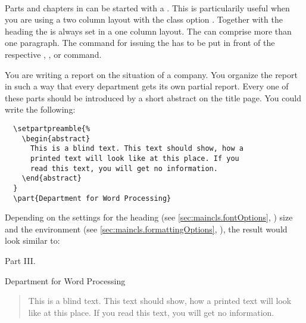 \begin{Declaration}
  \\
\end{Declaration}%
%
%
Parts and chapters in
{\KOMAScript} can be started with a . This is
particularily useful when you are using a two column layout with the
class option . Together with
the heading the  is always set in a one column layout.
The  can comprise more than one paragraph. The command
for issuing the  has to be put in front of the
respective , ,  or
 command.
\begin{Example}
  You are writing a report on the situation of a company. You organize
  the report in such a way that every department gets its own partial report.
  Every one of these parts should be introduced by a short abstract on the
  title page. You could write the following:
\begin{lstlisting}
  \setpartpreamble{%
    \begin{abstract}
      This is a blind text. This text should show, how a
      printed text will look like at this place. If you
      read this text, you will get no information.
    \end{abstract}
  }
  \part{Department for Word Processing}
\end{lstlisting}
  Depending on the settings for the heading (see
  \autoref{sec:maincls.fontOptions},
  ) size and the
   environment (see
  \autoref{sec:maincls.formattingOptions},
  ), the result would look similar
  to:
  \begin{ShowOutput}\centering
    {\LARGE{} Part III.\par\vspace{20pt}}
    {\LARGE{} Department for Word Processing\strut\par}
    \begin{quote}\small
      \vspace{3ex}
      \begin{center}
        \abstractname
      \end{center}
      \vspace{2ex} This is a blind text. This text should show, how a
      printed text will look like at this place. If you read this text,
      you will get no information.
    \end{quote}
  \end{ShowOutput}
\end{Example}

